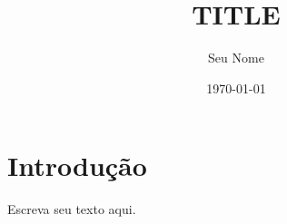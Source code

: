 \documentclass{article}
\title{{{TITLE}}}
\author{Seu Nome}
\date{\today}
\begin{document}
\maketitle

\section{Introdução}
Escreva seu texto aqui.
\end{document}
